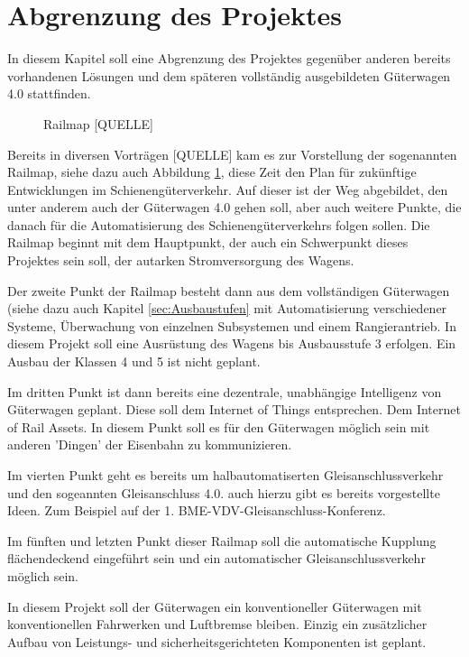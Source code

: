 \section{Abgrenzung des Projektes}
In diesem Kapitel soll eine Abgrenzung des Projektes gegenüber anderen bereits vorhandenen Lösungen und dem späteren vollständig ausgebildeten Güterwagen 4.0 stattfinden. \par
\begin{figure}[hbp]
    \centering
    
    \caption{Railmap [QUELLE]}
    \label{fig:Railmap}
\end{figure}
Bereits in diversen Vorträgen [QUELLE] kam es zur Vorstellung der sogenannten Railmap, siehe dazu auch Abbildung \ref{fig:Railmap}, diese Zeit den Plan für zukünftige Entwicklungen im Schienengüterverkehr. Auf dieser ist der Weg abgebildet, den unter anderem auch der Güterwagen 4.0  gehen soll, aber auch weitere Punkte, die danach für die Automatisierung des Schienengüterverkehrs folgen sollen. Die Railmap beginnt mit dem Hauptpunkt, der auch ein Schwerpunkt dieses Projektes sein soll, der autarken Stromversorgung des Wagens.\par
Der zweite Punkt der Railmap besteht dann aus dem vollständigen Güterwagen (siehe dazu auch Kapitel \ref{sec:Ausbaustufen} mit Automatisierung verschiedener Systeme, Überwachung von einzelnen Subsystemen und einem Rangierantrieb. In diesem Projekt soll eine Ausrüstung des Wagens bis Ausbausstufe 3 erfolgen. Ein Ausbau der Klassen 4 und 5 ist nicht geplant. \par
Im dritten Punkt ist dann bereits eine dezentrale, unabhängige Intelligenz von Güterwagen geplant. Diese soll dem Internet of Things entsprechen. Dem Internet of Rail Assets. In diesem Punkt soll es für den Güterwagen möglich sein mit anderen 'Dingen' der Eisenbahn zu kommunizieren.\par
Im vierten Punkt geht es bereits um halbautomatiserten Gleisanschlussverkehr und den sogeannten Gleisanschluss 4.0. auch hierzu gibt es bereits vorgestellte Ideen. Zum Beispiel auf der 1. BME-VDV-Gleisanschluss-Konferenz. \par
Im fünften und letzten Punkt dieser Railmap soll die automatische Kupplung flächendeckend eingeführt sein und ein automatischer Gleisanschlussverkehr möglich sein.\par
In diesem Projekt soll der Güterwagen ein konventioneller Güterwagen mit konventionellen Fahrwerken und Luftbremse bleiben. Einzig ein zusätzlicher Aufbau von Leistungs- und sicherheitsgerichteten Komponenten ist geplant.\par
